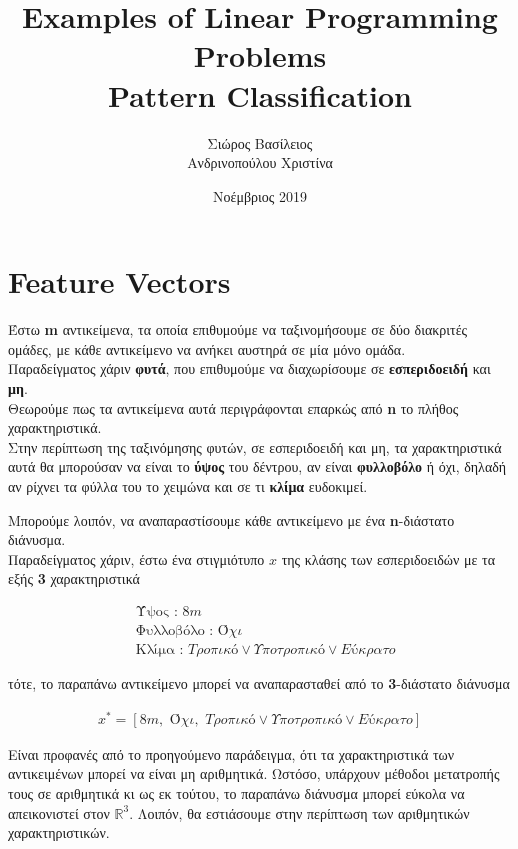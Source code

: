 \documentclass[12pt]{article}
\title{\huge Examples of Linear Programming Problems\\Pattern Classification}
\author{Σιώρος Βασίλειος\\Ανδρινοπούλου Χριστίνα}
\date{Νοέμβριος 2019}
\newcommand{\R}{\mathbb{R}}
\newcommand{\margin}{\hspace{4pt}}
\newcommand{\centered}[1]{\begin{align*}#1\end{align*}}
\begin{document}
\maketitle


\pagebreak

\section{Feature Vectors}

Έστω \textbf{m} αντικείμενα, τα οποία επιθυμούμε να ταξινομήσουμε σε δύο διακριτές ομάδες,
με κάθε αντικείμενο να ανήκει αυστηρά σε μία μόνο ομάδα. \\

Παραδείγματος χάριν \textbf{φυτά}, που επιθυμούμε να διαχωρίσουμε σε \textbf{εσπεριδοειδή} και \textbf{μη}.\\

Θεωρούμε πως τα αντικείμενα αυτά περιγράφονται επαρκώς από \textbf{n} το πλήθος χαρακτηριστικά. \\

Στην περίπτωση της ταξινόμησης φυτών, σε εσπεριδοειδή και μη, τα χαρακτηριστικά αυτά θα μπορούσαν
να είναι το \textbf{ύψος} του δέντρου, αν είναι \textbf{φυλλοβόλο} ή όχι, δηλαδή αν ρίχνει τα φύλλα του το χειμώνα και σε τι \textbf{κλίμα} ευδοκιμεί.

Μπορούμε λοιπόν, να αναπαραστίσουμε κάθε αντικείμενο με ένα \textbf{n}-διάστατο διάνυσμα. \\

Παραδείγματος χάριν, έστω ένα στιγμιότυπο \(x\) της κλάσης των εσπεριδοειδών με τα εξής \textbf{3} χαρακτηριστικά

\begin{align*}
    &\text{Ύψος : } \textit{8m} \\
    &\text{Φυλλοβόλο : } \textit{Όχι} \\
    &\text{Κλίμα : } \textit{Τροπικό} \vee \textit{Υποτροπικό} \vee \textit{Eύκρατο}
\end{align*}

τότε, το παραπάνω αντικείμενο μπορεί να αναπαρασταθεί από το \textbf{3}-διάστατο διάνυσμα

\centered{x^* = [\textit{8m}, \margin \textit{Όχι}, \margin \textit{Τροπικό} \vee \textit{Υποτροπικό} \vee \textit{Eύκρατο}]}

Είναι προφανές από το προηγούμενο παράδειγμα, ότι τα χαρακτηριστικά των αντικειμένων μπορεί να είναι μη αριθμητικά.
Ωστόσο, υπάρχουν μέθοδοι μετατροπής τους σε αριθμητικά κι ως εκ τούτου, το παραπάνω διάνυσμα μπορεί εύκολα να απεικονιστεί στον \( \R^{3} \).
Λοιπόν, θα εστιάσουμε στην περίπτωση των αριθμητικών χαρακτηριστικών. \\
\end{document}
